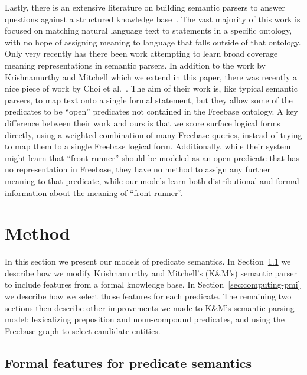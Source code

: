 \documentclass[11pt]{article}
\newcommand{\secref}[1]{Section~\ref{sec:#1}}
\begin{document}
Lastly, there is an extensive literature on building semantic parsers to answer
questions against a structured knowledge
base~\cite{zettlemoyer-2005-ccg,berant-2013-semantic-parsing-qa,%
kwiatkowski-2013-ontology-matching,krishnamurthy-2012-semantic-parsing}.  The
vast majority of this work is focused on matching natural language text to
statements in a specific ontology, with no hope of assigning meaning to
language that falls outside of that ontology.  Only very recently has there
been work attempting to learn broad coverage meaning representations in
semantic parsers.  In addition to the work by Krishnamurthy and Mitchell which
we extend in this paper, there was recently a nice piece of work by Choi et
al.~.  The aim of
their work is, like typical semantic parsers, to map text onto a single formal
statement, but they allow some of the predicates to be ``open'' predicates not
contained in the Freebase ontology.  A key difference between their work and
ours is that we score surface logical forms directly, using a weighted
combination of many Freebase queries, instead of trying to map them to a single
Freebase logical form.  Additionally, while their system might learn that
``front-runner'' should be modeled as an open predicate that has no
representation in Freebase, they have no method to assign any further meaning
to that predicate, while our models learn both distributional and formal
information about the meaning of ``front-runner''.

\section{Method}
\label{sec:method}

In this section we present our models of predicate semantics.  In
\secref{formal-and-distributional} we describe how we modify Krishnamurthy and
Mitchell's (K\&M's) semantic parser to include features from a formal knowledge
base.  In \secref{computing-pmi} we describe how we select those features for
each predicate.  The remaining two sections then describe other improvements we
made to K\&M's semantic parsing model: lexicalizing preposition and
noun-compound predicates, and using the Freebase graph to select candidate
entities.

\subsection{Formal features for predicate semantics}
\label{sec:formal-and-distributional}
\end{document}
